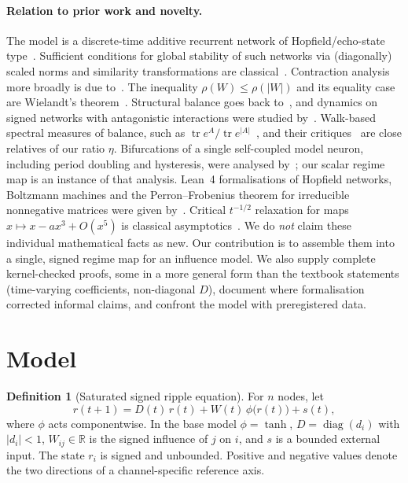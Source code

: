 \documentclass[11pt]{article}
\theoremstyle{definition}
\newtheorem{definition}{Definition}
\theoremstyle{remark}
\newcommand{\R}{\mathbb{R}}
\newcommand{\diag}{\operatorname{diag}}
\begin{document}
\paragraph{Relation to prior work and novelty.} The model is a discrete-time additive recurrent network
of Hopfield/echo-state type~\cite{hopfield1984,jaeger2001}. Sufficient conditions for global stability of
such networks via (diagonally) scaled norms and similarity transformations are
classical~\cite{jin1994,buehner2006,yildiz2012}. Contraction
analysis more broadly is due to~\cite{lohmiller1998}. The inequality $\rho(W)\le\rho(|W|)$ and its
equality case are Wielandt's theorem~\cite{wielandt1950,hornjohnson}. Structural balance goes back
to~\cite{heider1946,harary1953,cartwright1956}, and dynamics on signed networks with antagonistic
interactions were studied by~\cite{altafini2013}. Walk-based spectral measures of balance, such as
$\operatorname{tr}e^{A}/\operatorname{tr}e^{|A|}$~\cite{estrada2014}, and their
critiques~\cite{kirkley2019} are close relatives of our ratio $\eta$. Bifurcations of a single
self-coupled model neuron, including period doubling and hysteresis, were analysed
by~\cite{pasemann1993}; our scalar regime map is an instance of that analysis. Lean~4 formalisations of
Hopfield networks, Boltzmann machines and the Perron--Frobenius theorem for irreducible nonnegative
matrices were given by~\cite{cipollina2025}. Critical $t^{-1/2}$ relaxation for maps
$x\mapsto x-ax^3+O(x^5)$ is classical asymptotics~\cite{debruijn1958}. We do \emph{not} claim these
individual mathematical facts as new. Our contribution is to assemble them into a single, signed regime
map for an influence model. We also supply complete kernel-checked proofs, some in a more general form
than the textbook statements (time-varying coefficients, non-diagonal $D$), document where formalisation corrected informal claims, and
confront the model with preregistered data.

\section{Model}\label{sec:model}

\begin{definition}[Saturated signed ripple equation]
For $n$ nodes, let
\begin{equation}\label{eq:model}
  r(t+1)=D(t)\,r(t)+W(t)\,\phi\big(r(t)\big)+s(t),
\end{equation}
where $\phi$ acts componentwise. In the base model $\phi=\tanh$, $D=\diag(d_i)$ with $|d_i|<1$,
$W_{ij}\in\R$ is the signed influence of $j$ on $i$, and $s$ is a bounded external input. The state
$r_i$ is signed and unbounded. Positive and negative values denote the two directions of a
channel-specific reference axis.
\end{definition}
\end{document}
